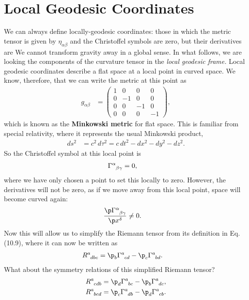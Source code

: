\documentclass[a4paper, 11pt, normalem]{report}
\begin{document}
\section{Local Geodesic Coordinates}
We can always define locally-geodesic coordinates: those in which the metric tensor is given by $\eta_{\alpha\beta}$ and the Christoffel symbols are zero, but their derivatives are 
We cannot transform gravity away in a global sense. 
In what follows, we are looking the components of the curvature tensor in the \emph{local geodesic frame.}
Local geodesic coordinates describe a flat space at a local point in curved space.
We know, therefore, that we can write the metric at this point as
\begin{align}
    g_{\alpha\beta} &= \begin{pmatrix} 1 & 0 & 0 & 0 \\ 0 & -1 & 0 & 0 \\ 0 & 0 & -1 & 0 \\ 0 & 0 & 0 & -1 \end{pmatrix},
\end{align}
which is known as the \textbf{Minkowski metric} for flat space.
This is familiar from special relativity, where it represents the usual Minkowski product,
\begin{align}
    ds^2 &= c^2\,d\tau^2 = c\,dt^2 - dx^2 - dy^2 - dz^2.
\end{align}
So the Christoffel symbol at this local point is
\begin{align}
    \tensor{\Gamma}{^\alpha_{\beta\gamma}} &= 0,
\end{align}
where we have only chosen a point to set this locally to zero.
However, the derivatives will not be zero, as if we move away from this local point, space will become curved again:
\begin{align}
    \frac{\p\tensor{\Gamma}{^\alpha_{\beta\gamma}}}{\p x^\delta} &\neq 0.
\end{align}
Now this will allow us to simplify the Riemann tensor from its definition in Eq. (10.9), where it can now be written as
\begin{align}
    \tensor{R}{^a_{dbc}} &= \p_b\tensor{\Gamma}{^a_{cd}} - \p_c\tensor{\Gamma}{^a_{bd}}.
\end{align}
What about the symmetry relations of this simplified Riemann tensor?
\begin{align}
    \tensor{R}{^a_{cdb}} &= \p_d\tensor{\Gamma}{^a_{bc}} - \p_b\tensor{\Gamma}{^a_{dc}}, \\
    \tensor{R}{^a_{bcd}} &= \p_c\tensor{\Gamma}{^a_{db}} - \p_d\tensor{\Gamma}{^a_{cb}}.
\end{align}
\end{document}
